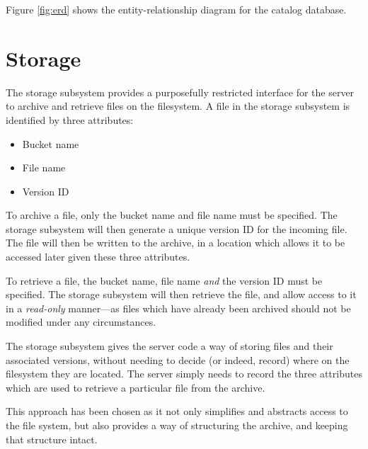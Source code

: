 Figure \ref{fig:erd} shows the entity-relationship diagram for the catalog
database.

\section{Storage}
\label{sec:design-storage}

The storage subsystem provides a purposefully restricted interface for the
server to archive and retrieve files on the filesystem. A file in the storage
subsystem is identified by three attributes:

\begin{itemize}
    \item Bucket name
    \item File name
    \item Version ID
\end{itemize}

To archive a file, only the bucket name and file name must be specified. The
storage subsystem will then generate a unique version ID for the incoming file.
The file will then be written to the archive, in a location which allows it to
be accessed later given these three attributes.

To retrieve a file, the bucket name, file name \emph{and} the version ID must
be specified. The storage subsystem will then retrieve the file, and allow
access to it in a \emph{read-only} manner---as files which have already been
archived should not be modified under any circumstances.

The storage subsystem gives the server code a way of storing files and their
associated versions, without needing to decide (or indeed, record) where on the
filesystem they are located. The server simply needs to record the three
attributes which are used to retrieve a particular file from the archive.

This approach has been chosen as it not only simplifies and abstracts access to
the file system, but also provides a way of structuring the archive, and
keeping that structure intact.

